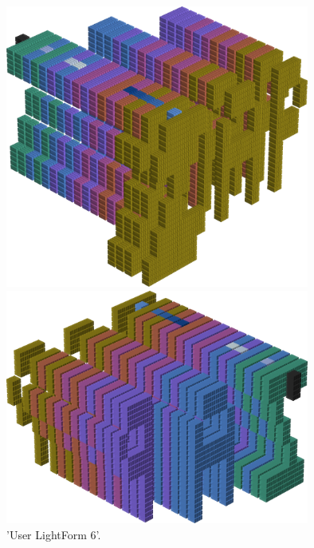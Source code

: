 \begin{minipage}[b]{0.48\linewidth}
\begin{figure}[H]
    \centering
    \begin{adjustbox}{width=5cm,margin=0cm 0cm}
      \includegraphics[width=10cm]{src/colorspace_patterns/pattern14-45.png}%
    \end{adjustbox}
    \begin{adjustbox}{width=5cm,margin=0cm 0cm}
      \includegraphics[width=10cm]{src/colorspace_patterns/pattern14-225.png}%
    \end{adjustbox}
\caption{'User LightForm 6'.}
\end{figure}
\end{minipage}
